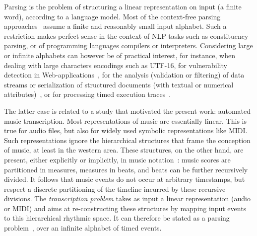 %
%
Parsing %
is the problem %
of structuring a linear representation on input %
(a finite word), according to a language model. %
%
Most of the context-free parsing approaches~\cite{GruneJacobs08parsing}
assume a finite and reasonably small input alphabet. %
Such a restriction makes perfect sense in the context of
NLP tasks such as constituency parsing,
or of programming languages compilers or interpreters.
Considering large or infinite alphabets can however be of
practical interest, %
%
for instance, when dealing with large characters encodings such as UTF-16, %
\eg for vulnerability detection in Web-applications~\cite{dAntoni21CACM},
%
for the analysis (\eg validation or filtering)
of data streams or serialization of structured documents
(with textual or numerical attributes)~\cite{Segoufin06csl},
or for processing timed execution traces~\cite{Bouyer03algebraic}.
%

The latter case is related to a study that motivated the present work:
automated music transcription. Most representations of music are
essentially linear. This is true for audio files,
but also for widely used symbolic representations like MIDI.
Such representations ignore the hierarchical structures that frame the
conception of music, at least in the western area. These structures, on the other hand,
are present, either explicitly  or implicitly,
in music notation~\cite{Gould11Notation}: music scores are partitioned in measures, measures
in beats, and beats can be further recursively divided.
It follows that music events do not occur at arbitrary timestamps,
but respect a discrete partitioning of the  timeline incurred by
these recursive divisions.
The \emph{transcription problem} takes
as input a linear representation (audio or MIDI) and aims at re-constructing
these structures
by mapping input events to this hierarchical rhythmic space.
It can therefore be stated as a parsing problem~\cite{foscarin:hal-01988990},
over an infinite alphabet of timed events.

